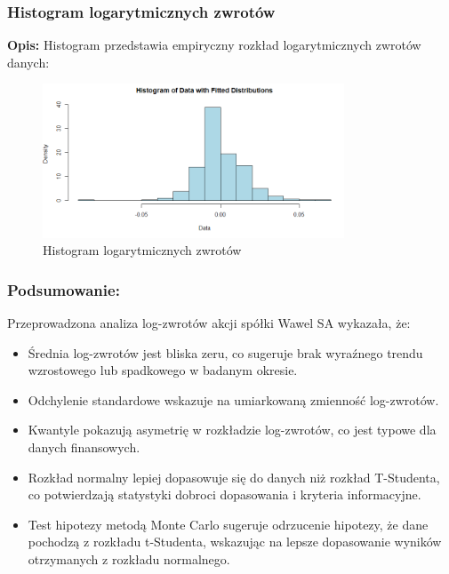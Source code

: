 \documentclass[a4paper,11pt]{article}
\begin{document}
\subsubsection*{Histogram logarytmicznych zwrotów}

\textbf{Opis:} Histogram przedstawia empiryczny rozkład logarytmicznych zwrotów danych:

\begin{figure}[H]
    \centering
    \includegraphics[width=0.8\textwidth]{./Wojtek/histogram_log_returns.png}
    \caption{Histogram logarytmicznych zwrotów}
    \label{fig:histogram_log_returns}
\end{figure}

\newpage\subsubsection{Podsumowanie:}

Przeprowadzona analiza log-zwrotów akcji spółki Wawel SA wykazała, że:

\begin{itemize}
    \item Średnia log-zwrotów jest bliska zeru, co sugeruje brak wyraźnego trendu wzrostowego lub spadkowego w badanym okresie.
    \item Odchylenie standardowe wskazuje na umiarkowaną zmienność log-zwrotów.
    \item Kwantyle pokazują asymetrię w rozkładzie log-zwrotów, co jest typowe dla danych finansowych.
    \item Rozkład normalny lepiej dopasowuje się do danych niż rozkład T-Studenta, co potwierdzają statystyki dobroci dopasowania i kryteria informacyjne.
    \item Test hipotezy metodą Monte Carlo sugeruje odrzucenie hipotezy, że dane pochodzą z rozkładu t-Studenta, wskazując na lepsze dopasowanie wyników otrzymanych z rozkładu normalnego.
\end{itemize}
\end{document}
